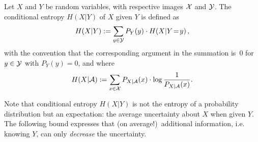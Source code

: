 \begin{definition}\label{def:CondEntropy}
Let $X$ and $Y$ be random variables, with respective images ${\cal
X}$ and ${\cal Y}$. 
The conditional entropy $H(X|Y)$ of $X$
given $Y$ is defined as
\[
H(X|Y) := \sum_{y\in {\cal Y}} P_Y(y)\cdot H(X|Y\!=\!y) \, ,
\]
with the convention that the corresponding argument in the summation is~$0$ for $y \in  \cal Y$ with $P_Y(y)=0$, and where
\[
H(X|{\cal A}) := \sum_{x\in {\cal X}} P_{X|{\cal A}}(x)\cdot \log
\frac{1}{P_{X|{\cal A}}(x)}.
\]
\end{definition}
%
Note that conditional entropy $H(X|Y)$ is not the entropy of a probability
distribution but an expectation: the average uncertainty about $X$
when given $Y$. The following bound expresses that (on average!)\ additional information, i.e. knowing $Y$, can only {\em decrease} the uncertainty.

